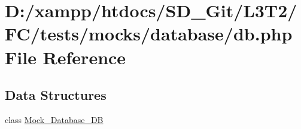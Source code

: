 \hypertarget{tests_2mocks_2database_2_d_b_8php}{}\section{D\+:/xampp/htdocs/\+S\+D\+\_\+\+Git/\+L3\+T2/\+F\+C/tests/mocks/database/db.php File Reference}
\label{tests_2mocks_2database_2_d_b_8php}
\subsection*{Data Structures}
\begin{DoxyCompactItemize}
\item 
class \hyperlink{class_mock___database___d_b}{Mock\+\_\+\+Database\+\_\+\+D\+B}
\end{DoxyCompactItemize}
